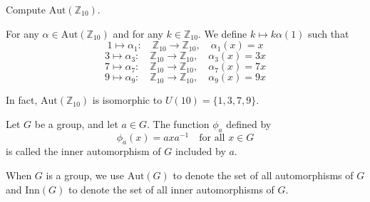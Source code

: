 \begin{example}
    Compute $\text{Aut}(\mathbb{Z}_{10})$.
\end{example}
\begin{solution}
    For any $\alpha \in \text{Aut}(\mathbb{Z}_{10})$ and for any $k \in \mathbb{Z}_{10}$. We define $k \mapsto k \alpha(1)$ such that 
    \[
        1 \mapsto \alpha_1 :\quad \mathbb{Z}_{10} \to \mathbb{Z}_{10}, \quad \alpha_1(x) = x
    \]
    \[
        3 \mapsto \alpha_3 :\quad \mathbb{Z}_{10} \to \mathbb{Z}_{10}, \quad \alpha_3(x) = 3x
    \]
    \[
        7 \mapsto \alpha_7 :\quad \mathbb{Z}_{10} \to \mathbb{Z}_{10}, \quad \alpha_7(x) = 7x
    \]
    \[
        9 \mapsto \alpha_9 :\quad \mathbb{Z}_{10} \to \mathbb{Z}_{10}, \quad \alpha_9(x) = 9x
    \]

    In fact, $\text{Aut}(\mathbb{Z}_{10})$ is isomorphic to $U(10) = \{ 1, 3, 7, 9\}$.
\end{solution}

\begin{definition}
    Let $G$ be a group, and let $a \in G$. The function $\phi_a$ defined by 
    \[
        \phi_a(x) = axa^{-1} \quad \text{for all } x \in G
    \]
    is called the inner automorphism of $G$ included by $a$.

    When $G$ is a group, we use $\text{Aut}(G)$ to denote the set of all automorphisms of $G$ and 
    $\text{Inn}(G)$ to denote the set of all inner automorphisms of $G$.
\end{definition}

